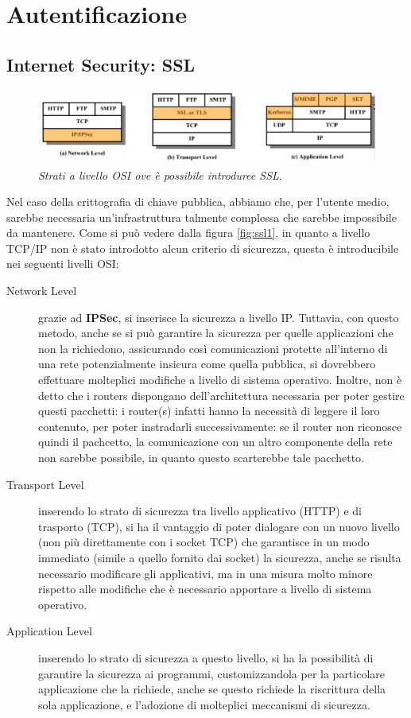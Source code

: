 \chapter{Autentificazione}

\section{Internet Security: SSL}\label{sec:isssl}
\begin{figure}[!th]
\centering
\includegraphics[scale=0.4]{images/ssl1.png}
\caption{\textit{Strati a livello OSI ove è possibile introduree SSL}.}
\label{fig:ssl1}
\end{figure}	
Nel caso della crittografia di chiave pubblica, abbiamo che, per l'utente medio,
sarebbe necessaria un'infrastruttura talmente complessa che sarebbe impossibile da
mantenere. Come si può vedere dalla figura \vref{fig:ssl1}, in quanto a livello
TCP/IP non è stato introdotto alcun criterio di sicurezza, questa è introducibile
nei seguenti livelli OSI:
\begin{description}
\item[Network Level] grazie ad \textbf{IPSec}, si inserisce la sicurezza a livello IP.
	Tuttavia, con questo metodo, anche se si può garantire la sicurezza
	per quelle applicazioni che non la richiedono, assicurando così comunicazioni protette all'interno
	di una rete potenzialmente insicura come quella pubblica, si dovrebbero
	effettuare molteplici modifiche a livello di sistema operativo. Inoltre,
	non è detto che i routers dispongano dell'architettura necessaria per
	poter gestire questi pacchetti: i router(s) infatti hanno la necessità di 
	leggere il loro contenuto, per poter instradarli successivamente: se 
	il router non riconosce quindi il pachcetto, la comunicazione con 
	un altro componente della rete non sarebbe possibile, in quanto questo
	scarterebbe tale pacchetto.
\item[Transport Level] inserendo lo strato di sicurezza tra livello applicativo
	(HTTP) e di trasporto (TCP), si ha il vantaggio di poter dialogare 
	con un nuovo livello (non più direttamente con i socket TCP) che
	garantisce in un modo immediato (simile a quello fornito dai socket)
	la sicurezza, anche se risulta necessario modificare gli applicativi,
	ma in una misura molto minore rispetto alle modifiche che è necessario
	apportare a livello di sistema operativo.
\item[Application Level] inserendo lo strato di sicurezza a questo livello, si
	ha la possibilità di garantire la sicurezza ai programmi, customizzandola
	per la particolare applicazione che la richiede, anche se questo richiede
	la riscrittura della sola applicazione, e l'adozione di molteplici 
	meccanismi di sicurezza.
\end{description}


